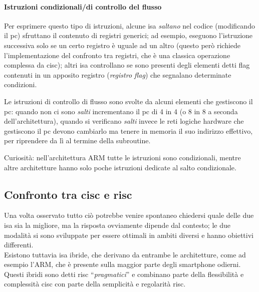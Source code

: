 \documentclass[class=book, crop=false, oneside]{standalone}
\begin{document}
\paragraph*{Istruzioni condizionali/di controllo del flusso}
Per esprimere questo tipo di istruzioni, alcune \acrshort{isa} \emph{saltano} nel codice (modificando il \acrfull{pc}) sfruttano il contenuto di registri generici; ad esempio, eseguono l’istruzione successiva solo se un certo registro è uguale ad un altro (questo però richiede l’implementazione del confronto tra registri, che è una classica operazione complessa da \acrshort{cisc}); altri \acrshort{isa} controllano se sono presenti  degli elementi detti flag contenuti in un apposito registro (\emph{registro flag}) che segnalano determinate condizioni.

Le istruzioni di controllo di flusso sono svolte da alcuni elementi che gestiscono il \acrshort{pc}: quando non ci sono \emph{salti} incrementano il \acrshort{pc} di 4 in 4 (o 8 in 8 a seconda dell’architettura), quando si verificano \emph{salti} invece le reti logiche hardware che gestiscono il \acrshort{pc} devono cambiarlo ma tenere in memoria il suo indirizzo effettivo, per riprendere da lì al termine della subroutine.

Curiosità: nell'architettura ARM tutte le istruzioni sono condizionali, mentre altre architetture hanno solo poche istruzioni dedicate al salto condizionale.

\subsection{Confronto tra \acrshort{cisc} e \acrshort{risc}}
Una volta osservato tutto ciò potrebbe venire spontaneo chiedersi quale delle due \acrshort{isa} sia la migliore, ma la risposta ovviamente dipende dal contesto; le due modalità si sono sviluppate per essere ottimali in ambiti diversi e hanno obiettivi differenti.\\
Esistono tuttavia \acrshort{isa} ibride, che derivano da entrambe le architetture, come ad esempio l’ARM, che è presente sulla maggior parte degli smartphone odierni. Questi ibridi sono detti \acrshort{risc} “\emph{pragmatici}” e combinano parte della flessibilità e complessità  \acrshort{cisc} con parte della semplicità e regolarità \acrshort{risc}.
\end{document}
